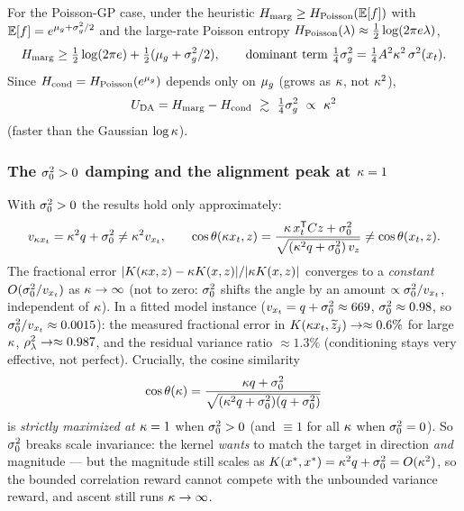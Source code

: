 \begin{proposition}\label{prop:poisson-c2}
For the Poisson-GP case, under the heuristic $H_{\mathrm{marg}}\ge H_{\mathrm{Poisson}}(\mathbb{E}[f])$ with
$\mathbb{E}[f]=e^{\mu_{g}+\sigma_{g}^{2}/2}$ and the large-rate Poisson entropy
$H_{\mathrm{Poisson}}(\lambda)\approx\tfrac12\log(2\pi e\lambda)$,
\[
  H_{\mathrm{marg}}\ge\tfrac12\log(2\pi e)+\tfrac12(\mu_{g}+\sigma_{g}^{2}/2),
  \qquad\text{dominant term }\tfrac14\sigma_{g}^{2}=\tfrac14A^2\kappa^2\,\sigma^{2}(x_t).
\]
Since $H_{\mathrm{cond}}=H_{\mathrm{Poisson}}(e^{\mu_{g}})$ depends only on $\mu_{g}$ (grows as $\kappa$, not
$\kappa^2$),
\[
  U_{\mathrm{DA}}=H_{\mathrm{marg}}-H_{\mathrm{cond}}\ \gtrsim\ \tfrac14\sigma_{g}^{2}\ \propto\ \kappa^2
\]
(faster than the Gaussian $\log\kappa$).
\end{proposition}

\subsubsection{The $\sigma_{0}^2>0$ damping and the alignment peak at $\kappa=1$}
With $\sigma_{0}^2>0$ the results hold only approximately:
\[
  v_{\kappa x_t}=\kappa^2 q+\sigma_{0}^2\neq\kappa^2v_{x_t},\qquad
  \cos\theta(\kappa x_t,z)=\frac{\kappa\,x_t^{\mathsf{T}}C z+\sigma_{0}^2}{\sqrt{(\kappa^2 q+\sigma_{0}^2)\,v_z}}\neq\cos\theta(x_t,z).
\]
The fractional error $|K(\kappa x,z)-\kappa K(x,z)|/|\kappa K(x,z)|$ converges to a
\emph{constant} $O(\sigma_{0}^2/v_{x_t})$ as $\kappa\to\infty$ (not to zero: $\sigma_{0}^2$
shifts the angle by an amount $\propto\sigma_{0}^2/v_{x_t}$, independent of $\kappa$).
In a fitted model instance ($v_{x_t}=q+\sigma_{0}^2\approx669$, $\sigma_{0}^2\approx0.98$, so
$\sigma_{0}^2/v_{x_t}\approx0.0015$): the measured fractional error in
$K(\kappa x_t,\widetilde{z}_j)\to\approx0.6\%$ for large $\kappa$, $\rho_{\lambda}^2\to\approx0.987$,
and the residual variance ratio $\approx1.3\%$ (conditioning stays very effective,
not perfect). Crucially, the cosine similarity
\[
  \cos\theta(\kappa)=\frac{\kappa q+\sigma_{0}^2}{\sqrt{(\kappa^2 q+\sigma_{0}^2)(q+\sigma_{0}^2)}}
\]
is \emph{strictly maximized at $\kappa=1$} when $\sigma_{0}^2>0$ (and $\equiv1$ for all
$\kappa$ when $\sigma_{0}^2=0$). So $\sigma_{0}^2$ breaks scale invariance: the kernel
\emph{wants} to match the target in direction \emph{and} magnitude --- but the
magnitude still scales as $K(x^*,x^*)=\kappa^2 q+\sigma_{0}^2=O(\kappa^2)$, so the
bounded correlation reward cannot compete with the unbounded variance reward, and
ascent still runs $\kappa\to\infty$.

